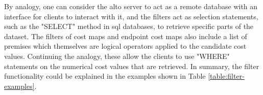     By analogy, one can consider the \gls{alto} server to act as a remote database with an interface for clients to interact with it, and the filters act as selection statements, such as the "SELECT" method in \gls{sql} databases, to retrieve specific parts of the dataset.
    The filters of cost maps and endpoint cost maps also include a list of premises which themselves are logical operators applied to the candidate cost values.
    Continuing the analogy, these allow the clients to use "WHERE" statements on the numerical cost values that are retrieved.
    In summary, the filter functionality could be explained in the examples shown in Table \ref{table:filter-examples}.

\begin{table}[H]
\end{table}
